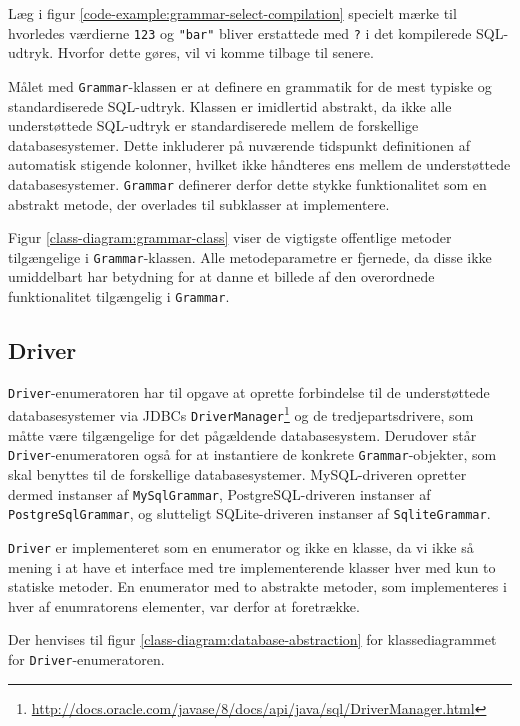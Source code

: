 Læg i figur \ref{code-example:grammar-select-compilation} specielt mærke til hvorledes værdierne \texttt{123} og \texttt{"bar"} bliver erstattede med \texttt{?} i det kompilerede SQL-udtryk. Hvorfor dette gøres, vil vi komme tilbage til senere.

Målet med \texttt{Grammar}-klassen er at definere en grammatik for de mest typiske og standardiserede SQL-udtryk. Klassen er imidlertid abstrakt, da ikke alle understøttede SQL-udtryk er standardiserede mellem de forskellige databasesystemer. Dette inkluderer på nuværende tidspunkt definitionen af automatisk stigende kolonner, hvilket ikke håndteres ens mellem de understøttede databasesystemer. \texttt{Grammar} definerer derfor dette stykke funktionalitet som en abstrakt metode, der overlades til subklasser at implementere.

Figur \ref{class-diagram:grammar-class} viser de vigtigste offentlige metoder tilgængelige i \texttt{Grammar}-klassen. Alle metodeparametre er fjernede, da disse ikke umiddelbart har betydning for at danne et billede af den overordnede funktionalitet tilgængelig i \texttt{Grammar}.

\subsection{Driver}

\texttt{Driver}-enumeratoren har til opgave at oprette forbindelse til de understøttede databasesystemer via JDBCs \texttt{Driver\-Manager}\footnote{\url{http://docs.oracle.com/javase/8/docs/api/java/sql/DriverManager.html}} og de tredjepartsdrivere, som måtte være tilgængelige for det pågældende databasesystem. Derudover står \texttt{Driver}-enumeratoren også for at instantiere de konkrete \texttt{Grammar}-objekter, som skal benyttes til de forskellige databasesystemer. MySQL-driveren opretter dermed instanser af \texttt{MySql\-Grammar}, PostgreSQL-driveren instanser af \texttt{PostgreSql\-Grammar}, og slutteligt SQLite-driveren instanser af \texttt{Sqlite\-Grammar}.

\texttt{Driver} er implementeret som en enumerator og ikke en klasse, da vi ikke så mening i at have et interface med tre implementerende klasser hver med kun to statiske metoder. En enumerator med to abstrakte metoder, som implementeres i hver af enumratorens elementer, var derfor at foretrække.

Der henvises til figur \ref{class-diagram:database-abstraction} for klassediagrammet for \texttt{Driver}-enumeratoren.

